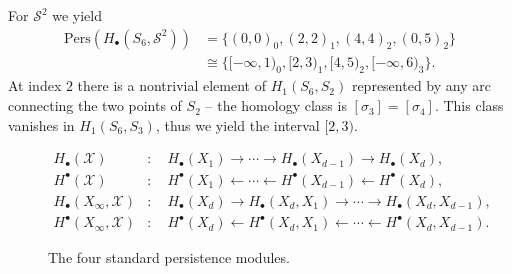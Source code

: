 \begin{example}
	For $\mathcal{S}^{2}$ we yield
	\begin{align}
		\mathrm{Pers}(H_{\bullet}(S_{6},\mathcal{S}^{2})) & = \{(0,0)_{0}, (2,2)_{1}, (4,4)_{2}, (0,5)_{2}\}               \\
		                                                  & \cong \{[-\infty, 1)_{0}, [2,3)_{1}, [4,5)_{2}, [-\infty,6)_{3}\}.
	\end{align}
	At index $2$ there is a nontrivial element of $H_{1}(S_{6},S_{2})$ represented
	by any arc connecting the two points of $S_{2}$ \cite[\S 2.4, Example]{de2011dualities} --
	the homology class is $[\sigma_{3}] = [\sigma_{4}]$. This class vanishes in $H_{1}(S_{6},S_{3})$, thus we yield the interval $[2,3)$.
\end{example}

\begin{figure}[htb!]
	\begin{align*}
		H_{\bullet}(\mathcal{X})             & : \quad H_{\bullet}(X_{1}) \rightarrow \cdots \rightarrow H_{\bullet}(X_{d-1}) \rightarrow H_{\bullet}(X_{d}),             \\
		H^{\bullet}(\mathcal{X})             & : \quad H^{\bullet}(X_{1}) \leftarrow \cdots \leftarrow H^{\bullet}(X_{d-1}) \leftarrow H^{\bullet}(X_{d}),                \\
		H_{\bullet}(X_{\infty}, \mathcal{X}) & : \quad H_{\bullet}(X_{d}) \rightarrow H_{\bullet}(X_{d},X_{1}) \rightarrow \cdots \rightarrow H_{\bullet}(X_{d},X_{d-1}), \\
		H^{\bullet}(X_{\infty}, \mathcal{X}) & : \quad H^{\bullet}(X_{d}) \leftarrow H^{\bullet}(X_{d},X_{1}) \leftarrow \cdots \leftarrow H^{\bullet}(X_{d}, X_{d-1}).
	\end{align*}
	\caption{The four standard persistence modules.}
\end{figure}

